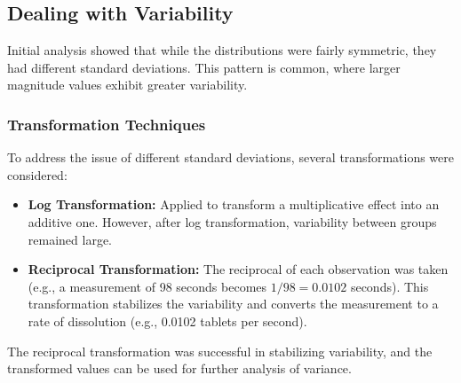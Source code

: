\documentclass{article}
\begin{document}
\subsection*{Dealing with Variability}

Initial analysis showed that while the distributions were fairly symmetric, they had different standard deviations. This pattern is common, where larger magnitude values exhibit greater variability.

\subsubsection*{Transformation Techniques}

To address the issue of different standard deviations, several transformations were considered:
\begin{itemize}
    \item \textbf{Log Transformation:} Applied to transform a multiplicative effect into an additive one. However, after log transformation, variability between groups remained large.
    \item \textbf{Reciprocal Transformation:} The reciprocal of each observation was taken (e.g., a measurement of 98 seconds becomes \(1/98 = 0.0102\) seconds). This transformation stabilizes the variability and converts the measurement to a rate of dissolution (e.g., 0.0102 tablets per second).
\end{itemize}

The reciprocal transformation was successful in stabilizing variability, and the transformed values can be used for further analysis of variance.
\end{document}
